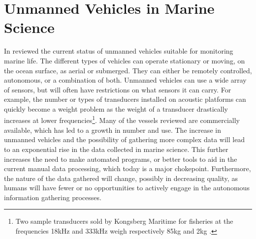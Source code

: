     
\section{Unmanned Vehicles in Marine Science} \label{Unmanned Vehicles in Marine Science}
        In \citeyear{VERFUSS201917} \citeauthor{VERFUSS201917}\cite{VERFUSS201917} reviewed the current status of unmanned vehicles suitable for monitoring marine life. The different types of vehicles can operate stationary or moving, on the ocean surface, as aerial or submerged.  They can either be remotely controlled, autonomous, or a combination of both. Unmanned vehicles can use a wide array of sensors, but will often have restrictions on what sensors it can carry. For example, the number or types of transducers installed on acoustic platforms can quickly become a weight problem as the weight of a transducer drastically increases at lower frequencies\footnote{Two sample transducers sold by Kongsberg Maritime for fisheries at the frequencies 18kHz and 333kHz weigh respectively 85kg and 2kg \cite{kongsberg_transducers}.}. Many of the vessels reviewed are commercially available, which has led to a growth in number and use.  The increase in unmanned vehicles and the possibility of gathering more complex data will lead to an exponential rise in the data collected in marine science\cite{malde2020machine}. This further increases the need to make automated programs, or better tools to aid in the current manual data processing, which today is a major chokepoint. Furthermore, the nature of the data gathered will change, possibly in decreasing quality, as humans will have fewer or no opportunities to actively engage in the autonomous information gathering processes.
        
        
